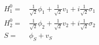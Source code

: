 \begin{align} 
H_1^0 = & \, \frac{1}{\sqrt{2}} \phi_1  + \frac{1}{\sqrt{2}} v_1  + i \frac{1}{\sqrt{2}} \sigma_1 \\ 
H_2^0 = & \, \frac{1}{\sqrt{2}} \phi_2  + \frac{1}{\sqrt{2}} v_2  + i \frac{1}{\sqrt{2}} \sigma_2 \\ 
S = & \, \phi_S + v_S
\end{align} 
